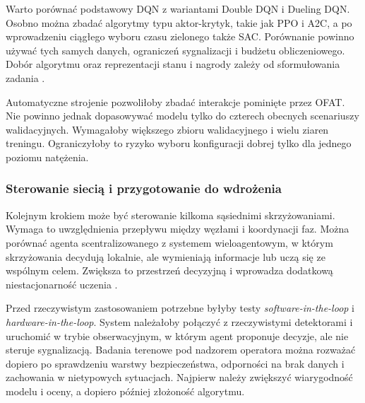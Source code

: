 Warto porównać podstawowy DQN z wariantami Double DQN i Dueling DQN. Osobno można zbadać algorytmy typu aktor-krytyk, takie jak PPO i A2C, a po wprowadzeniu ciągłego wyboru czasu zielonego także SAC. Porównanie powinno używać tych samych danych, ograniczeń sygnalizacji i budżetu obliczeniowego. Dobór algorytmu oraz reprezentacji stanu i nagrody zależy od sformułowania zadania \cite{wei2019survey}.

Automatyczne strojenie pozwoliłoby zbadać interakcje pominięte przez OFAT. Nie powinno jednak dopasowywać modelu tylko do czterech obecnych scenariuszy walidacyjnych. Wymagałoby większego zbioru walidacyjnego i wielu ziaren treningu. Ograniczyłoby to ryzyko wyboru konfiguracji dobrej tylko dla jednego poziomu natężenia.

\subsubsection{Sterowanie siecią i przygotowanie do wdrożenia}

Kolejnym krokiem może być sterowanie kilkoma sąsiednimi skrzyżowaniami. Wymaga to uwzględnienia przepływu między węzłami i koordynacji faz. Można porównać agenta scentralizowanego z systemem wieloagentowym, w którym skrzyżowania decydują lokalnie, ale wymieniają informacje lub uczą się ze wspólnym celem. Zwiększa to przestrzeń decyzyjną i wprowadza dodatkową niestacjonarność uczenia \cite{chu2020multiagent}.

Przed rzeczywistym zastosowaniem potrzebne byłyby testy \textit{software-in-the-loop} i \\\textit{hardware-in-the-loop}. System należałoby połączyć z rzeczywistymi detektorami i uruchomić w trybie obserwacyjnym, w którym agent proponuje decyzje, ale nie steruje sygnalizacją. Badania terenowe pod nadzorem operatora można rozważać dopiero po sprawdzeniu warstwy bezpieczeństwa, odporności na brak danych i zachowania w nietypowych sytuacjach. Najpierw należy zwiększyć wiarygodność modelu i oceny, a dopiero później złożoność algorytmu.
